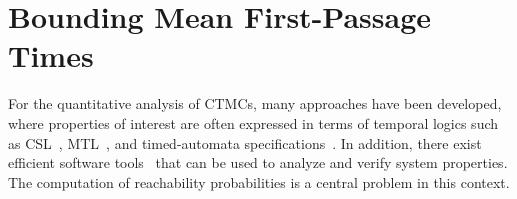 \chapter{Bounding Mean First-Passage Times}\label{ch:MFPT}







For the quantitative analysis of \acp{CTMC}, many   approaches have been
developed, where properties of interest are often expressed in terms of temporal logics such as
\acs{CSL}~\cite{aziz1996verifying,baier2000model,baier2003model},
\acs{MTL}~\cite{chen2011time}, and timed-automata
specifications~\cite{chen2009quantitative,mikeev2013fly}.
In addition, there exist
efficient software
tools~\cite{hinton2006prism,kwiatkowska2011prism,dehnert2017storm}
that can be used to analyze and verify system properties.
The computation of reachability probabilities is a central problem in this context.

